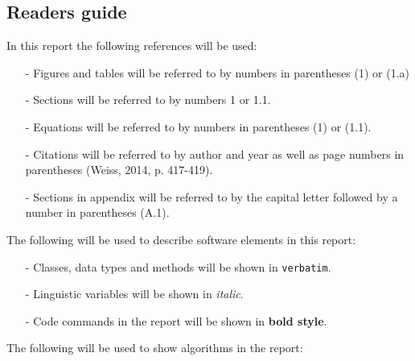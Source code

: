 \documentclass[../Head/Main.tex]{subfiles}
\begin{document}


\clearpage
\subsection{Readers guide}

In this report the following references will be used:

\begin{itemize}

\item[-] Figures and tables will be referred to by numbers in parentheses (1) or (1.a)
\item[-] Sections will be referred to by numbers 1 or 1.1.
\item[-] Equations will be referred to by numbers in parentheses (1) or (1.1).
\item[-] Citations will be referred to by author and year as well as page numbers in parentheses (Weiss, 2014, p. 417-419). 
\item[-] Sections in appendix will be referred to by the capital letter followed by a number in parentheses (A.1).   
\end{itemize}

\vspace{20pt}
The following will be used to describe software elements in this report:

\begin{itemize}
\item[-] Classes, data types and methods will be shown in \texttt{verbatim}. 
\item[-] Linguistic variables will be shown in \textit{italic}.
\item[-] Code commands in the report will be shown in \textbf{bold style}.
 
\end{itemize}
\vspace{20pt}
The following will be used to show algorithms in the report: 


\end{document}
